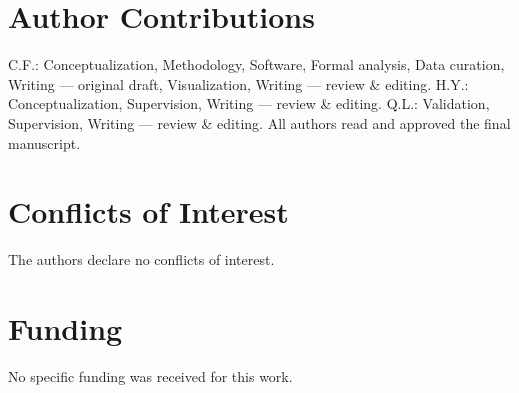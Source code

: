 \documentclass[12pt,a4paper]{article}
\begin{document}
\section*{Author Contributions}
C.F.: Conceptualization, Methodology, Software, Formal analysis, Data
curation, Writing --- original draft, Visualization, Writing --- review \& editing.
H.Y.: Conceptualization, Supervision, Writing --- review \& editing.
Q.L.: Validation, Supervision, Writing --- review \& editing.
All authors read and approved the final manuscript.

\section*{Conflicts of Interest}
The authors declare no conflicts of interest.

\section*{Funding}
No specific funding was received for this work.




\clearpage
\end{document}
